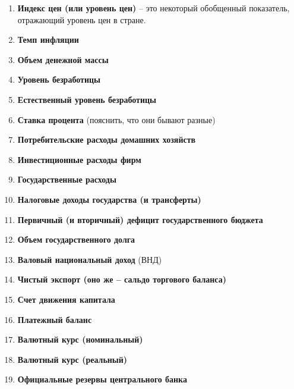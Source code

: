 \documentclass[12pt,a4paper]{article}
\begin{document}
\begin{enumerate}
\item \textbf{Индекс цен (или уровень цен)} – это некоторый обобщенный показатель, отражающий уровень цен в стране. 

\item \textbf{Темп инфляции}
\item \textbf{Объем денежной массы}
\item \textbf{Уровень безработицы}
\item \textbf{Естественный уровень безработицы}
\item \textbf{Ставка процента}  (пояснить, что они бывают разные)
\item \textbf{Потребительские расходы домашних хозяйств}
\item \textbf{Инвестиционные расходы фирм}
\item \textbf{Государственные расходы}
\item \textbf{Налоговые доходы государства (и трансферты)}
\item \textbf{Первичный (и вторичный) дефицит государственного бюджета}
\item \textbf{Объем государственного долга}
\item \textbf{Валовый национальный доход} (ВНД)
\item \textbf{Чистый экспорт (оно же – сальдо торгового баланса)}
\item \textbf{Счет движения капитала}
\item \textbf{Платежный баланс}
\item \textbf{Валютный курс (номинальный)}
\item \textbf{Валютный курс (реальный)}
\item \textbf{Официальные резервы центрального банка}
\end{enumerate}
\end{document}
